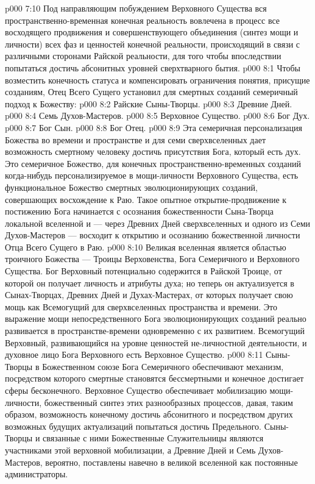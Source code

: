 \vs p000 7:10 Под направляющим побуждением Верховного Существа вся пространственно\hyp{}временная конечная реальность вовлечена в процесс все восходящего продвижения и совершенствующего объединения (синтез мощи и личности) всех фаз и ценностей конечной реальности, происходящий в связи с различными сторонами Райской реальности, для того чтобы впоследствии попытаться достичь абсонитных уровней сверхтварного бытия.
\vs p000 8:1 Чтобы возместить конечность статуса и компенсировать ограничения понятия, присущие созданиям, Отец Всего Сущего установил для смертных созданий семеричный подход к Божеству:
\vs p000 8:2 \bibnobreakspace Райские Сыны\hyp{}Творцы.
\vs p000 8:3 \bibnobreakspace Древние Дней.
\vs p000 8:4 \bibnobreakspace Семь Духов\hyp{}Мастеров.
\vs p000 8:5 \bibnobreakspace Верховное Существо.
\vs p000 8:6 \bibnobreakspace Бог Дух.
\vs p000 8:7 \bibnobreakspace Бог Сын.
\vs p000 8:8 \bibnobreakspace Бог Отец.
\vs p000 8:9 \pc Эта семеричная персонализация Божества во времени и пространстве и для семи сверхвселенных дает возможность смертному человеку достичь присутствия Бога, который есть дух. Это семеричное Божество, для конечных пространственно\hyp{}временных созданий когда\hyp{}нибудь персонализируемое в мощи\hyp{}личности Верховного Существа, есть функциональное Божество смертных эволюционирующих созданий, совершающих восхождение к Раю. Такое опытное открытие\hyp{}продвижение к постижению Бога начинается с осознания божественности Сына\hyp{}Творца локальной вселенной и --- через Древних Дней сверхвселенных и одного из Семи Духов\hyp{}Мастеров --- восходит к открытию и осознанию божественной личности Отца Всего Сущего в Раю.
\vs p000 8:10 \pc Великая вселенная является областью троичного Божества --- Троицы Верховенства, Бога Семеричного и Верховного Существа. Бог Верховный потенциально содержится в Райской Троице, от которой он получает личность и атрибуты духа; но теперь он актуализуется в Сынах\hyp{}Творцах, Древних Дней и Духах\hyp{}Мастерах, от которых получает свою мощь как Всемогущий для сверхвселенных пространства и времени. Это выражение мощи непосредственного Бога эволюционирующих созданий реально развивается в пространстве\hyp{}времени одновременно с их развитием. Всемогущий Верховный, развивающийся на уровне ценностей не\hyp{}личностной деятельности, и духовное лицо Бога Верховного есть  Верховное Существо.
\vs p000 8:11 Сыны\hyp{}Творцы в Божественном союзе Бога Семеричного обеспечивают механизм, посредством которого смертные становятся бессмертными и конечное достигает сферы бесконечного. Верховное Существо обеспечивает мобилизацию мощи\hyp{}личности, божественный синтез  этих разнообразных процессов, давая, таким образом, возможность конечному достичь абсонитного и посредством других возможных будущих актуализаций попытаться достичь Предельного. Сыны\hyp{}Творцы и связанные с ними Божественные Служительницы являются участниками этой верховной мобилизации, а Древние Дней и Семь Духов\hyp{}Мастеров, вероятно, поставлены навечно в великой вселенной как постоянные администраторы.
